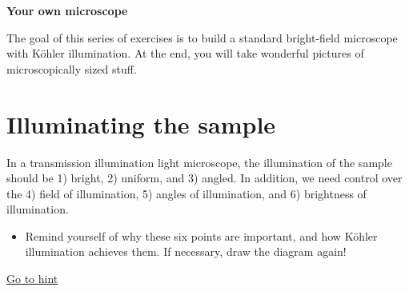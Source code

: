 \documentclass[a4paper]{report}
\begin{document}
	
	\setcounter{secnumdepth}{2}
	
	\begin{center}
		\textbf{\Large{Your own microscope}}
	\end{center}
	
	\vspace{0.8cm}
	\noindent 
	The goal of this series of exercises is to build a standard bright-field microscope with K\"{o}hler illumination. At the end, you will take wonderful pictures of microscopically sized stuff.
	


	\section{Illuminating the sample}
	\hypertarget{hintBack-illumination}{}
	
	In a transmission illumination light microscope, the illumination of the sample should be 1) bright, 2) uniform, and 3) angled. In addition, we need control over the 4) field of illumination, 5) angles of illumination, and 6) brightness of illumination.
	
	\begin{itemize}
	    \item Remind yourself of why these six points are important, and how K\"{o}hler illumination achieves them. If necessary, draw the diagram again! 
	\end{itemize}
	
    \noindent
	\hyperlink{hintTo-illumination}{Go to hint}
\end{document}
